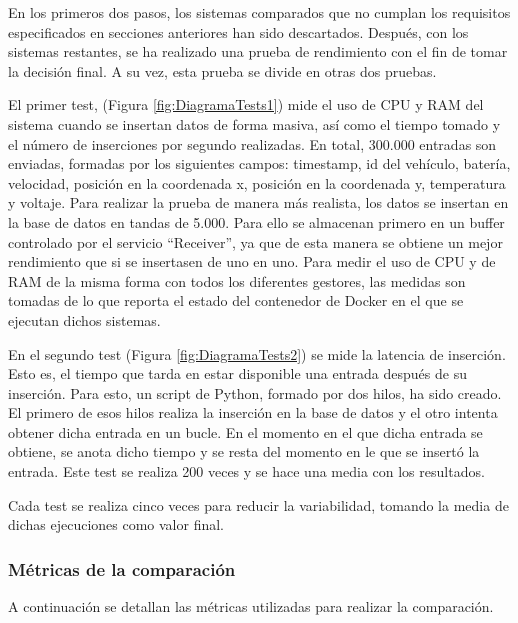 En los primeros dos pasos, los sistemas comparados que no cumplan los requisitos especificados en secciones anteriores
han sido descartados. Después, con los sistemas restantes, se ha realizado una prueba de rendimiento con el fin de
tomar la decisión final. A su vez, esta prueba se divide en otras dos pruebas.


El primer test, (Figura \ref{fig:DiagramaTests1}) mide el uso de CPU y RAM del sistema cuando se insertan datos de forma
masiva, así como el tiempo tomado y el número de inserciones por segundo realizadas. En total, 300.000 entradas son enviadas,
formadas por los siguientes campos: timestamp, id del vehículo, batería, velocidad, posición en la coordenada x, posición
en la coordenada y, temperatura y voltaje. Para realizar la prueba de manera más realista, los datos se insertan en la
base de datos en tandas de 5.000. Para ello se almacenan primero en un buffer controlado por el servicio ``Receiver'', ya
que de esta manera se obtiene un mejor rendimiento que si se insertasen de uno en uno. Para medir el uso de CPU y de RAM
de la misma forma con todos los diferentes gestores, las medidas son tomadas de lo que reporta el estado del contenedor
de Docker en el que se ejecutan dichos sistemas.

En el segundo test (Figura \ref{fig:DiagramaTests2}) se mide la latencia de inserción. Esto es, el tiempo que tarda
en estar disponible una entrada después de su inserción. Para esto, un script de Python, formado por dos hilos, ha sido creado.
El primero de esos hilos realiza la inserción en la base de datos y el otro intenta obtener dicha entrada en un bucle.
En el momento en el que dicha entrada se obtiene, se anota dicho tiempo y se resta del momento en le que se insertó
la entrada. Este test se realiza 200 veces y se hace una media con los resultados.

Cada test se realiza cinco veces para reducir la variabilidad, tomando la media de dichas ejecuciones como valor final.

\subsubsection{Métricas de la comparación} 
A continuación se detallan las métricas utilizadas para realizar la comparación.


